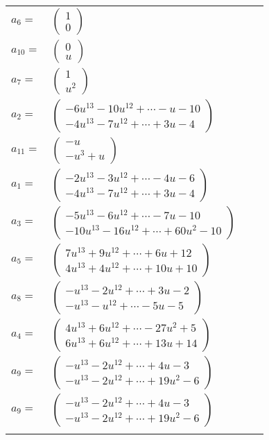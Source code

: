 \documentclass[1p]{elsarticle_modified}
\theoremstyle{definition}
\begin{document}
\begin{tabular}{m{7pt} m{180pt} m{7pt} m{180pt} }
\flushright $a_{6}=$&$\begin{pmatrix}1\\0\end{pmatrix}$ \\
\flushright $a_{10}=$&$\begin{pmatrix}0\\u\end{pmatrix}$ \\
\flushright $a_{7}=$&$\begin{pmatrix}1\\u^2\end{pmatrix}$ \\
\flushright $a_{2}=$&$\begin{pmatrix}-6 u^{13}-10 u^{12}+\cdots- u-10\\-4 u^{13}-7 u^{12}+\cdots+3 u-4\end{pmatrix}$ \\
\flushright $a_{11}=$&$\begin{pmatrix}- u\\- u^3+u\end{pmatrix}$ \\
\flushright $a_{1}=$&$\begin{pmatrix}-2 u^{13}-3 u^{12}+\cdots-4 u-6\\-4 u^{13}-7 u^{12}+\cdots+3 u-4\end{pmatrix}$ \\
\flushright $a_{3}=$&$\begin{pmatrix}-5 u^{13}-6 u^{12}+\cdots-7 u-10\\-10 u^{13}-16 u^{12}+\cdots+60 u^2-10\end{pmatrix}$ \\
\flushright $a_{5}=$&$\begin{pmatrix}7 u^{13}+9 u^{12}+\cdots+6 u+12\\4 u^{13}+4 u^{12}+\cdots+10 u+10\end{pmatrix}$ \\
\flushright $a_{8}=$&$\begin{pmatrix}- u^{13}-2 u^{12}+\cdots+3 u-2\\- u^{13}- u^{12}+\cdots-5 u-5\end{pmatrix}$ \\
\flushright $a_{4}=$&$\begin{pmatrix}4 u^{13}+6 u^{12}+\cdots-27 u^2+5\\6 u^{13}+6 u^{12}+\cdots+13 u+14\end{pmatrix}$ \\
\flushright $a_{9}=$&$\begin{pmatrix}- u^{13}-2 u^{12}+\cdots+4 u-3\\- u^{13}-2 u^{12}+\cdots+19 u^2-6\end{pmatrix}$\\ \flushright $a_{9}=$&$\begin{pmatrix}- u^{13}-2 u^{12}+\cdots+4 u-3\\- u^{13}-2 u^{12}+\cdots+19 u^2-6\end{pmatrix}$\\&\end{tabular}
\end{document}
